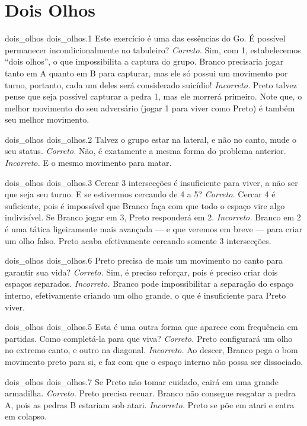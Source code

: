 \chapter{Dois Olhos}

\emptypage

\problemAnswerDiagram
  {dois_olhos}
  {dois_olhos.1}
  {Este exercício é uma das essências do Go. É possível permanecer incondicionalmente no tabuleiro?}
  {\emph{Correto.} Sim, com 1, estabelecemos ``dois olhos'', o que impossibilita a captura do grupo. Branco precisaria jogar tanto em A quanto em B para capturar, mas ele só possui um movimento por turno, portanto, cada um deles será considerado suicídio!}
  {\emph{Incorreto.} Preto talvez pense que seja possível capturar a pedra 1, mas ele morrerá primeiro. Note que, o melhor movimento do seu adversário (jogar 1 para viver como Preto) é também seu melhor movimento.}

\problemAnswerDiagram
  {dois_olhos}
  {dois_olhos.2}
  {Talvez o grupo estar na lateral, e não no canto, mude o seu status.}
  {\emph{Correto.} Não, é exatamente a mesma forma do problema anterior.}
  {\emph{Incorreto.} E o mesmo movimento para matar.}

\problemAnswerDiagram
  {dois_olhos}
  {dois_olhos.3}
  {Cercar 3 intersecções é insuficiente para viver, a não ser que seja seu turno. E se estivermos cercando de 4 a 5?}
  {\emph{Correto.} Cercar 4 é suficiente, pois é impossível que Branco faça com que todo o espaço vire algo indivisível. Se Branco jogar em 3, Preto responderá em 2.}
  {\emph{Incorreto.} Branco em 2 é uma tática ligeiramente mais avançada --- e que veremos em breve --- para criar um olho falso. Preto acaba efetivamente cercando somente 3 intersecções.}

\problemAnswerDiagram
  {dois_olhos}
  {dois_olhos.6}
  {Preto precisa de mais um movimento no canto para garantir sua vida?}
  {\emph{Correto.} Sim, é preciso reforçar, pois é preciso criar dois espaços separados.}
  {\emph{Incorreto.} Branco pode impossibilitar a separação do espaço interno, efetivamente criando um olho grande, o que é insuficiente para Preto viver.}

\problemAnswerDiagram
  {dois_olhos}
  {dois_olhos.5}
  {Esta é uma outra forma que aparece com frequência em partidas. Como completá-la para que viva?}
  {\emph{Correto.} Preto configurará um olho no extremo canto, e outro na diagonal.}
  {\emph{Incorreto.} Ao descer, Branco pega o bom movimento preto para si, e faz com que o espaço interno não possa ser dissociado.}

\problemAnswerDiagram
  {dois_olhos}
  {dois_olhos.7}
  {Se Preto não tomar cuidado, cairá em uma grande armadilha.}
  {\emph{Correto.} Preto precisa recuar. Branco não consegue resgatar a pedra A, pois as pedras B estariam sob atari.}
  {\emph{Incorreto.} Preto se põe em atari e entra em colapso.}